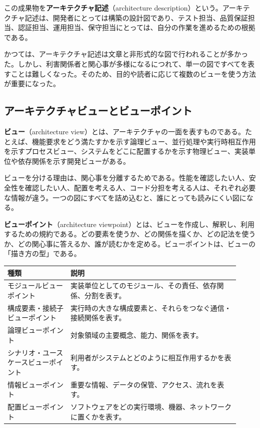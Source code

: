 \documentclass[a4paper,11pt]{ltjsarticle}
\newcommand{\keyterm}[1]{\textbf{#1}}
\newcommand{\en}[1]{（#1）}
\begin{document}
この成果物を\keyterm{アーキテクチャ記述}\en{architecture description}という。アーキテクチャ記述は、開発者にとっては構築の設計図であり、テスト担当、品質保証担当、認証担当、運用担当、保守担当にとっては、自分の作業を進めるための根拠である。

かつては、アーキテクチャ記述は文章と非形式的な図で行われることが多かった。しかし、利害関係者と関心事が多様になるにつれて、単一の図ですべてを表すことは難しくなった。そのため、目的や読者に応じて複数のビューを使う方法が重要になった。

\subsection{アーキテクチャビューとビューポイント}
\keyterm{ビュー}\en{architecture view}とは、アーキテクチャの一面を表すものである。たとえば、機能要求をどう満たすかを示す論理ビュー、並行処理や実行時相互作用を示すプロセスビュー、システムをどこに配置するかを示す物理ビュー、実装単位や依存関係を示す開発ビューがある。

ビューを分ける理由は、関心事を分離するためである。性能を確認したい人、安全性を確認したい人、配置を考える人、コード分担を考える人は、それぞれ必要な情報が違う。一つの図にすべてを詰め込むと、誰にとっても読みにくい図になる。

\keyterm{ビューポイント}\en{architecture viewpoint}とは、ビューを作成し、解釈し、利用するための規約である。どの要素を使うか、どの関係を描くか、どの記法を使うか、どの関心事に答えるか、誰が読むかを定める。ビューポイントは、ビューの「描き方の型」である。

\begin{longtable}{P{0.25\linewidth}P{0.67\linewidth}}
\toprule
種類 & 説明 \\
\midrule
モジュールビューポイント & 実装単位としてのモジュール、その責任、依存関係、分割を表す。 \\
構成要素・接続子ビューポイント & 実行時の大きな構成要素と、それらをつなぐ通信・接続関係を表す。 \\
論理ビューポイント & 対象領域の主要概念、能力、関係を表す。 \\
シナリオ・ユースケースビューポイント & 利用者がシステムとどのように相互作用するかを表す。 \\
情報ビューポイント & 重要な情報、データの保管、アクセス、流れを表す。 \\
配置ビューポイント & ソフトウェアをどの実行環境、機器、ネットワークに置くかを表す。 \\
\bottomrule
\end{longtable}
\end{document}

